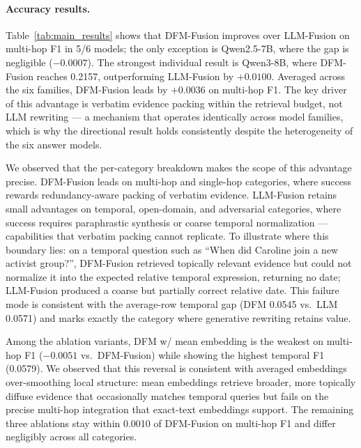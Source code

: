 \paragraph{Accuracy results.}
Table~\ref{tab:main_results} shows that DFM-Fusion improves over LLM-Fusion on multi-hop F1 in 5/6 models; the only exception is Qwen2.5-7B, where the gap is negligible ($-0.0007$). The strongest individual result is Qwen3-8B, where DFM-Fusion reaches 0.2157, outperforming LLM-Fusion by $+0.0100$. Averaged across the six families, DFM-Fusion leads by $+0.0036$ on multi-hop F1. The key driver of this advantage is verbatim evidence packing within the retrieval budget, not LLM rewriting --- a mechanism that operates identically across model families, which is why the directional result holds consistently despite the heterogeneity of the six answer models.

We observed that the per-category breakdown makes the scope of this advantage precise. DFM-Fusion leads on multi-hop and single-hop categories, where success rewards redundancy-aware packing of verbatim evidence. LLM-Fusion retains small advantages on temporal, open-domain, and adversarial categories, where success requires paraphrastic synthesis or coarse temporal normalization --- capabilities that verbatim packing cannot replicate. To illustrate where this boundary lies: on a temporal question such as ``When did Caroline join a new activist group?'', DFM-Fusion retrieved topically relevant evidence but could not normalize it into the expected relative temporal expression, returning no date; LLM-Fusion produced a coarse but partially correct relative date. This failure mode is consistent with the average-row temporal gap (DFM 0.0545 vs.\ LLM 0.0571) and marks exactly the category where generative rewriting retains value.

Among the ablation variants, DFM w/ mean embedding is the weakest on multi-hop F1 ($-0.0051$ vs.\ DFM-Fusion) while showing the highest temporal F1 (0.0579). We observed that this reversal is consistent with averaged embeddings over-smoothing local structure: mean embeddings retrieve broader, more topically diffuse evidence that occasionally matches temporal queries but fails on the precise multi-hop integration that exact-text embeddings support. The remaining three ablations stay within 0.0010 of DFM-Fusion on multi-hop F1 and differ negligibly across all categories.

